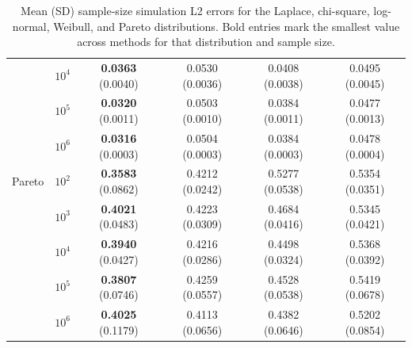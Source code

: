 \begin{table}[p]
{\begin{tabular}{llcccc}
 & $10^4$ & \textbf{0.0363} (0.0040) & 0.0530 (0.0036) & 0.0408 (0.0038) & 0.0495 (0.0045) \\
 & $10^5$ & \textbf{0.0320} (0.0011) & 0.0503 (0.0010) & 0.0384 (0.0011) & 0.0477 (0.0013) \\
 & $10^6$ & \textbf{0.0316} (0.0003) & 0.0504 (0.0003) & 0.0384 (0.0003) & 0.0478 (0.0004) \\[0.6ex]
\midrule
Pareto & $10^2$ & \textbf{0.3583} (0.0862) & 0.4212 (0.0242) & 0.5277 (0.0538) & 0.5354 (0.0351) \\
 & $10^3$ & \textbf{0.4021} (0.0483) & 0.4223 (0.0309) & 0.4684 (0.0416) & 0.5345 (0.0421) \\
 & $10^4$ & \textbf{0.3940} (0.0427) & 0.4216 (0.0286) & 0.4498 (0.0324) & 0.5368 (0.0392) \\
 & $10^5$ & \textbf{0.3807} (0.0746) & 0.4259 (0.0557) & 0.4528 (0.0538) & 0.5419 (0.0678) \\
 & $10^6$ & \textbf{0.4025} (0.1179) & 0.4113 (0.0656) & 0.4382 (0.0646) & 0.5202 (0.0854) \\[0.6ex]
\bottomrule
\end{tabular}%
}
\caption{Mean (SD) sample-size simulation L2 errors for the Laplace, chi-square, log-normal, Weibull, and Pareto distributions. Bold entries mark the smallest value across methods for that distribution and sample size.}
\label{tab:l2_sample_size_group2_mean}
\end{table}

